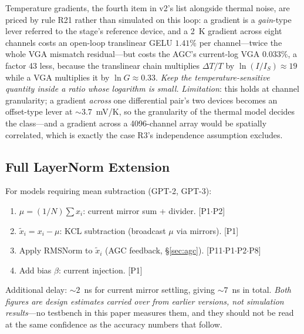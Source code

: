\documentclass[11pt]{article}
\begin{document}
Temperature gradients, the fourth item in v2's list alongside thermal noise, are priced by rule R21 rather than simulated on this loop: a gradient is a \textit{gain}-type lever referred to the stage's reference device, and a 2~K gradient across eight channels costs an open-loop translinear GELU $1.41\%$ per channel---twice the whole VGA mismatch residual---but costs the AGC's current-log VGA $0.033\%$, a factor 43 less, because the translinear chain multiplies $\Delta T/T$ by $\ln(I/I_S)\approx19$ while a VGA multiplies it by $\ln G \approx 0.33$. \textit{Keep the temperature-sensitive quantity inside a ratio whose logarithm is small.} \textit{Limitation}: this holds at channel granularity; a gradient \textit{across} one differential pair's two devices becomes an offset-type lever at ${\sim}3.7$~mV/K, so the granularity of the thermal model decides the class---and a gradient across a 4096-channel array would be spatially correlated, which is exactly the case R3's independence assumption excludes.

\subsection{Full LayerNorm Extension}

For models requiring mean subtraction (GPT-2, GPT-3):
\begin{enumerate}[leftmargin=*]
\item $\mu = (1/N)\sum x_i$: current mirror sum + divider. \hfill [P1$\cdot$P2]
\item $\tilde{x}_i = x_i - \mu$: KCL subtraction (broadcast $\mu$ via mirrors). \hfill [P1]
\item Apply RMSNorm to $\tilde{x}_i$ (AGC feedback, \S\ref{sec:agc}). \hfill [P11$\cdot$P1$\cdot$P2$\cdot$P8]
\item Add bias $\beta$: current injection. \hfill [P1]
\end{enumerate}

Additional delay: ${\sim}2$~ns for current mirror settling, giving ${\sim}7$~ns in total. \textit{Both figures are design estimates carried over from earlier versions, not simulation results}---no testbench in this paper measures them, and they should not be read at the same confidence as the accuracy numbers that follow.
\end{document}
